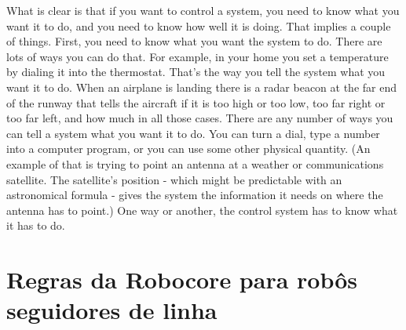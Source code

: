 What is clear is that if you want to control a system, you need to know what you want it to do, and you need to know how well it
is doing.  That implies a couple of things.  First, you need to know what you want the system to do.  There are lots of ways you can 
do that.  For example, in your home you set a temperature by dialing it into the thermostat.  That's the way you tell the system 
what you want it to do.  When an airplane is landing there is a radar beacon at the far end of the runway that tells the aircraft 
if it is too high or too low, too far right or too far left, and how much in all those cases.  There are any number of ways you can 
tell a system what you want it to do.  You can turn a dial, type a number into a computer program, or you can use some other physical 
quantity.  (An example of that is trying to point an antenna at a weather or communications satellite.  The satellite's position - 
which might be predictable with an astronomical formula - gives the system the information it needs on where the antenna has to point.) 
One way or another, the control system has to know what it has to do. 

\vspace{1cm}
\section{Regras da Robocore para robôs seguidores de linha} \label{cap:regras_comp}

